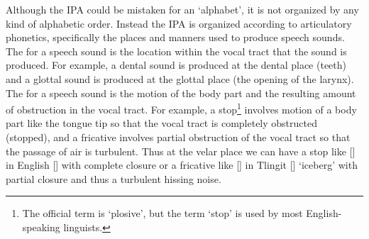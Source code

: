 Although the IPA could be mistaken for an ‘alphabet’, it is not organized by any kind of alphabetic order. Instead the IPA is organized according to articulatory phonetics, specifically the places and manners used to produce speech sounds. The  for a speech sound is the location within the vocal tract that the sound is produced. For example, a dental sound is produced at the dental place (teeth) and a glottal sound is produced at the glottal place (the opening of the larynx). The  for a speech sound is the motion of the body part and the resulting amount of obstruction in the vocal tract. For example, a stop\footnote{The official term is ‘plosive’, but the term ‘stop’ is used by most English-speaking linguists.} involves motion of a body part like the tongue tip so that the vocal tract is completely obstructed (stopped), and a fricative involves partial obstruction of the vocal tract so that the passage of air is turbulent. Thus at the velar place we can have a stop like [] in English  [] with complete closure or a fricative like [] in Tlingit  [] ‘iceberg’ with partial closure and thus a turbulent hissing noise.

